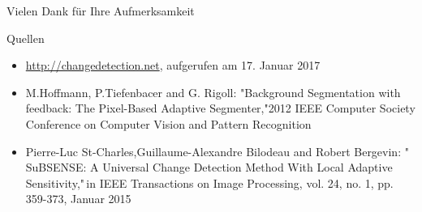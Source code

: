 \documentclass[hyperref={pdfpagelabels=false}]{beamer}
\begin{document}
\begin{frame}
	\centering
	\vspace{3em}
	\large{Vielen Dank für Ihre Aufmerksamkeit}
\end{frame}


\begin{frame}[t]{Quellen}
	\begin{itemize}
		\item \url{http://changedetection.net}, aufgerufen am 17. Januar 2017
		\item M.Hoffmann, P.Tiefenbacer and G. Rigoll: "Background Segmentation with feedback: The Pixel-Based Adaptive Segmenter,"2012 IEEE Computer Society Conference on Computer Vision and Pattern Recognition
		\item Pierre-Luc St-Charles,Guillaume-Alexandre Bilodeau and Robert Bergevin: "\,SuBSENSE: A Universal Change Detection Method With Local Adaptive Sensitivity,"\,in IEEE Transactions on Image Processing, vol. 24, no. 1, pp. 359-373, Januar 2015
	\end{itemize}
\end{frame}
\end{document}
